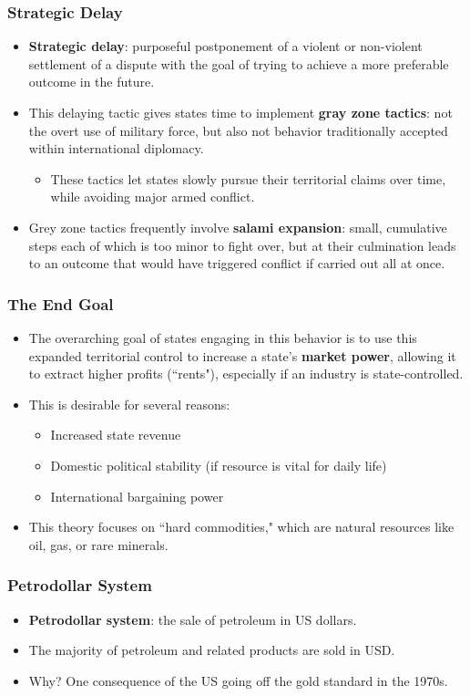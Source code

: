 \documentclass{beamer}
\begin{document}
\begin{frame} 
	\frametitle{\LARGE{Strategic Delay}}
	\begin{itemize}
		\item \textbf{Strategic delay}: purposeful postponement of a violent or non-violent settlement of a dispute  with the goal of trying to achieve a more preferable outcome in the future. \pause
		\item This delaying tactic gives states time to implement \textbf{gray zone tactics}: not the overt use of military force, but also not behavior traditionally accepted within international diplomacy. \pause
		\begin{itemize}
			\item These tactics let states slowly pursue their territorial claims over time, while avoiding major armed conflict. \pause
		\end{itemize}	
		\item Grey zone tactics frequently involve \textbf{salami expansion}: small, cumulative steps each of which is too minor to fight over, but at their culmination leads to an outcome that would have triggered conflict if carried out all at once. 
	\end{itemize}
\end{frame}

\begin{frame} 
	\frametitle{\LARGE{The End Goal}}
	\begin{itemize}
		\item The overarching goal of states engaging in this behavior is to use this expanded territorial control to increase a state's \textbf{market power}, allowing it to extract higher profits (``rents"), especially if an industry is state-controlled. \pause
		\item This is desirable for several reasons:
		\begin{itemize}
			\item Increased state revenue
			\item Domestic political stability (if resource is vital for daily life)
			\item International bargaining power
		\end{itemize}
		\item This theory focuses on ``hard commodities," which are natural resources like oil, gas, or rare minerals.	
	\end{itemize}
\end{frame}

\begin{frame} 
	\frametitle{\LARGE{Petrodollar System}}
	\begin{itemize}
		\item \textbf{Petrodollar system}: the sale of petroleum in US dollars. \pause
		\item The majority of petroleum and related products are sold in USD. \pause
		\item Why? One consequence of the US going off the gold standard in the 1970s. 
	\end{itemize}
\end{frame}
\end{document}
